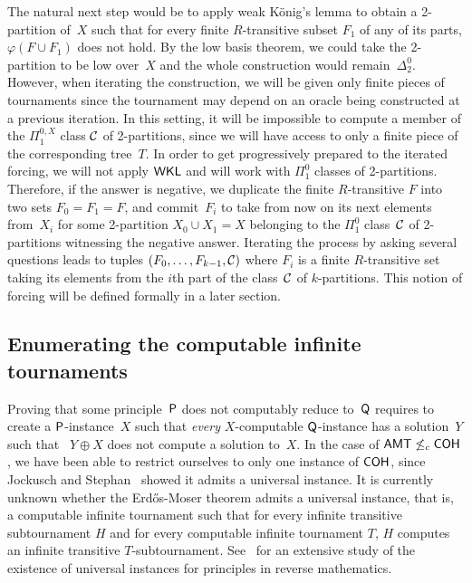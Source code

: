 The natural next step would be to apply weak K\"onig's lemma to obtain a 2-partition of~$X$
such that for every finite $R$-transitive subset $F_1$ of any of its parts, $\varphi(F \cup F_1)$ does not hold.
By the low basis theorem, we could take the 2-partition to be low over~$X$ and the whole construction would remain~$\Delta^0_2$.
However, when iterating the construction, we will be given only finite pieces of tournaments
since the tournament may depend on an oracle being constructed at a previous iteration. In this setting,
it will be impossible to compute a member of the $\Pi^{0,X}_1$ class $\mathcal{C}$ of 2-partitions, since 
we will have access to only a finite piece of the corresponding tree~$T$.
In order to get progressively prepared to the iterated forcing, we will not apply $\operatorname{\sf{WKL}}$
and will work with $\Pi^0_1$ classes of 2-partitions.
Therefore, if the answer is negative, we duplicate the finite $R$-transitive $F$ into two sets $F_0 = F_1 = F$,
and commit~$F_i$ to take from now on its next elements from~$X_i$ for some 2-partition
$X_0 \cup X_1 = X$ belonging to the $\Pi^0_1$ class~$\mathcal{C}$ of 2-partitions witnessing the negative answer.
Iterating the process by asking several questions leads to tuples $(F_0, \dots, F_{k-1}, \mathcal{C})$
where $F_i$ is a finite $R$-transitive set taking its elements from the $i$th part of the class~$\mathcal{C}$ of $k$-partitions.
This notion of forcing will be defined formally in a later section.

\subsection{Enumerating the computable infinite tournaments}

Proving that some principle~$\mathsf{P}$ does not computably reduce to~$\mathsf{Q}$
requires to create a $\mathsf{P}$-instance~$X$ such that \emph{every} $X$-computable $\mathsf{Q}$-instance
has a solution~$Y$ such that~ $Y \oplus X$ does not compute a solution to~$X$.
In the case of $\operatorname{\sf{AMT}} \not \leq_c \operatorname{\sf{COH}}$, we have been able to restrict ourselves to only one instance of $\operatorname{\sf{COH}}$,
since Jockusch and Stephan~\cite{Jockusch1993cohesive} showed it admits a universal instance.
It is currently unknown whether the Erd\H{o}s-Moser theorem admits a universal instance, that is, a computable infinite tournament
such that for every infinite transitive subtournament $H$ and for every computable infinite tournament $T$,
$H$ computes an infinite transitive $T$-subtournament. See~\cite{Patey2015Degrees} for an extensive study of the existence
of universal instances for principles in reverse mathematics.

